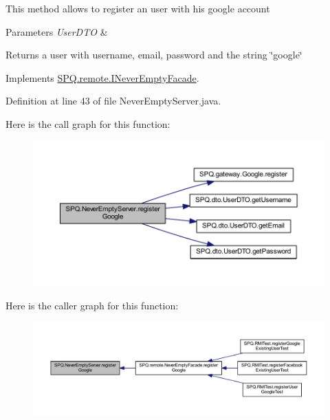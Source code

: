 This method allows to register an user with his google account 
\begin{DoxyParams}{Parameters}
{\em User\+D\+TO} & \\
\hline
\end{DoxyParams}
\begin{DoxyReturn}{Returns}
a user with username, email, password and the string \char`\"{}google\char`\"{} 
\end{DoxyReturn}


Implements \mbox{\hyperlink{interface_s_p_q_1_1remote_1_1_i_never_empty_facade_a93f3250c09a26fdb1d65219599dfd542}{S\+P\+Q.\+remote.\+I\+Never\+Empty\+Facade}}.



Definition at line 43 of file Never\+Empty\+Server.\+java.

Here is the call graph for this function\+:\nopagebreak
\begin{figure}[H]
\begin{center}
\leavevmode
\includegraphics[width=350pt]{class_s_p_q_1_1_never_empty_server_ac97355451c02fc378cb5d8f33f442ce6_cgraph}
\end{center}
\end{figure}
Here is the caller graph for this function\+:\nopagebreak
\begin{figure}[H]
\begin{center}
\leavevmode
\includegraphics[width=350pt]{class_s_p_q_1_1_never_empty_server_ac97355451c02fc378cb5d8f33f442ce6_icgraph}
\end{center}
\end{figure}
\mbox{\label{class_s_p_q_1_1_never_empty_server_ae52815c925e04018d6a1b2742d605063}} 
